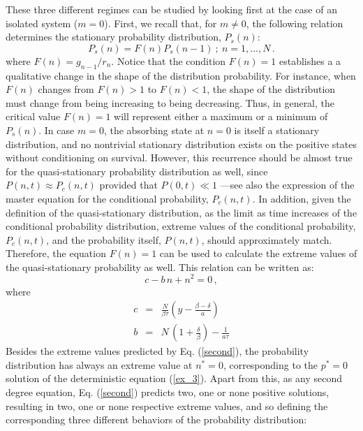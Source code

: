 These three different regimes can be studied by looking first at the case of an isolated system ($m=0$). First, we recall that, for $m \not= 0$, the following relation determines the stationary probability distribution, $P_s(n)$:
\begin{equation}
P_s(n) = F(n) P_s(n-1)\ ; \ n = 1,...,N\,. 
\label{balance_2}
\end{equation}  
where $F(n)=g_{n-1}/{r_n}$. Notice that the condition $F(n)=1$ establishes a a qualitative change in the shape of the distribution probability. For instance, when $F(n)$ changes from $F(n)>1$ to $F(n)<1$, the shape of the distribution must change from being increasing to being decreasing. Thus, in general, the critical value $F(n)=1$ will represent either a maximum or a minimum of $P_s(n)$. In case $m=0$, the absorbing state at $n=0$ is itself a stationary distribution, and no nontrivial stationary distribution exists on the positive states without conditioning on survival. However, this recurrence should be almost true for the quasi-stationary probability distribution as well, since $P(n,t) \approx P_c(n,t)$ provided that $P(0,t) \ll 1$ ---see also the expression of the master equation for the conditional probability, $P_c(n,t)$. In addition, given the definition of the quasi-stationary distribution, as the limit as time increases of the conditional probability distribution, extreme values of the conditional probability, $P_c(n,t)$, and the probability itself, $P(n,t)$, should approximately match. Therefore, the equation $F(n)=1$ can be used to calculate the extreme values of the quasi-stationary probability as well. This relation can be written as: 
\begin{equation}
\label{second}
c - b\,n + n^2=0\,, 
\end{equation}
where
\begin{eqnarray}
\label{eq_c}
c & = & \frac{N}{\beta\tau}\left(y - \frac{\beta-\delta}{a}\right)\\
b & = & N\,\left(1+\frac{\delta}{\beta}\right)-\frac{1}{a\tau}
\label{eq_b}
\end{eqnarray}
Besides the extreme values predicted by Eq. (\ref{second}), the probability distribution has always an extreme value at $n^{*}=0$, corresponding to the $p^{*}=0$ solution of the deterministic equation (\ref{ex_3}). Apart from this, as any second degree equation, Eq. (\ref{second}) predicts two, one or none positive solutions, resulting in two, one or none respective extreme values, and so defining the corresponding three different behaviors of the probability distribution:
